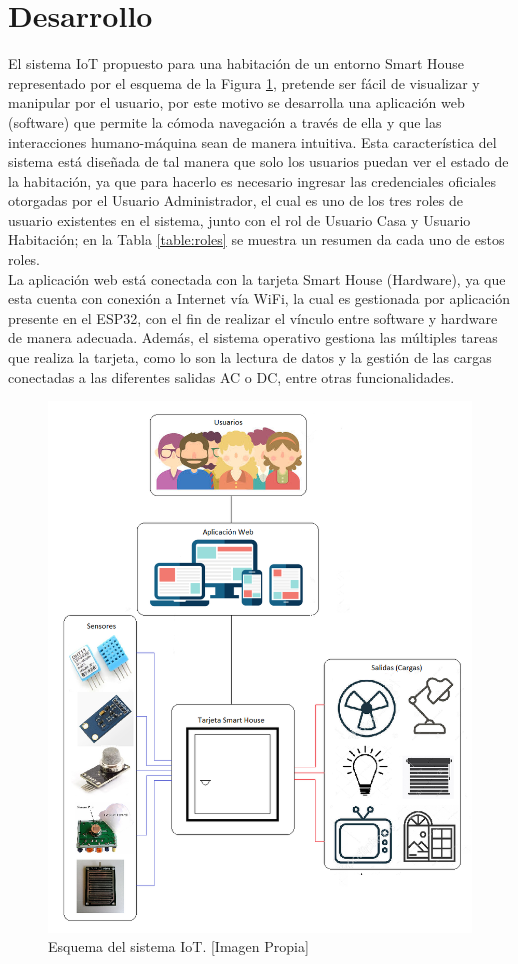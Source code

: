 \section{Desarrollo}

El sistema IoT propuesto para una habitación de un entorno Smart House representado por el esquema de la Figura \ref{fig:diagramas}, pretende ser fácil de visualizar y manipular por el usuario, por este motivo se desarrolla una aplicación web (software) que permite la cómoda navegación a través de ella y que las interacciones humano-máquina sean de manera intuitiva. Esta característica del sistema está diseñada de tal manera que solo los usuarios puedan ver el estado de la habitación, ya que para hacerlo es necesario ingresar las credenciales oficiales otorgadas por el Usuario Administrador, el cual es uno de los tres roles de usuario existentes en el sistema, junto con el rol de Usuario Casa y Usuario Habitación; en la Tabla \ref{table:roles} se muestra un resumen da cada uno de estos roles.\\
 
La aplicación web está conectada con la tarjeta Smart House (Hardware), ya que esta cuenta con conexión a Internet vía WiFi, la cual es gestionada por aplicación presente en el ESP32, con el fin de realizar el vínculo entre software y hardware de manera adecuada. Además, el sistema operativo gestiona las múltiples tareas que realiza la tarjeta, como lo son la lectura de datos y la gestión de las cargas conectadas a las diferentes salidas AC o DC, entre otras funcionalidades.\\

\begin{figure}[!t]
	\centering
	\caption[Esquema del sistema IoT.]{Esquema del sistema IoT. [Imagen Propia]}
	\label{fig:diagramas}
	\includegraphics[width=0.5\linewidth]{Imagenes/Diagramas}
\end{figure}

